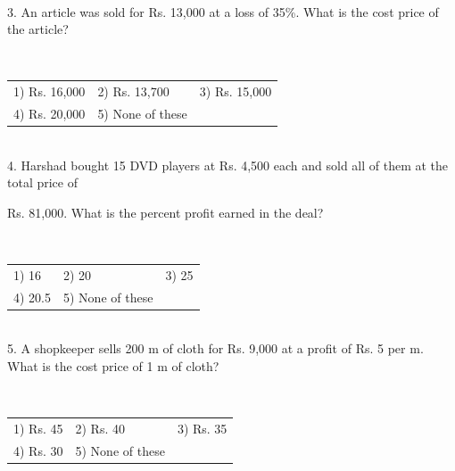 \documentclass{article}
\begin{document}
	\noindent 


	\noindent 
	
	\noindent 
	
	\noindent  \\ 3.   An article was sold for Rs. 13,000 at a loss of 35\%. What is the cost price of the article?
	
	\noindent 
	


	\noindent  \\ 
	\begin{tabular}{p{1.7in} p{1.6in} p{1.6in}} \\ 
 1) Rs. 16,000             & 2) Rs. 13,700       & 3) Rs. 15,000       \\
4) Rs. 20,000       & 5) None of these \\
\end{tabular} 
	
	\noindent 
	
	\noindent 
	
	\noindent 
	
	\noindent \\  4.   Harshad bought 15 DVD players at Rs. 4,500 each and sold all of them at the total price of
	
	\noindent 
	
	\noindent Rs. 81,000. What is the percent profit earned in the deal?
	
	\noindent 
	
	\noindent  \\ 
	\begin{tabular}{p{1.7in} p{1.6in} p{1.6in}} \\ 
 1) 16                        & 2) 20                 & 3) 25                 \\
4) 20.5              & 5) None of these \\
\end{tabular}
	
	\noindent 
	
	\noindent 
	
	\noindent 
	
	\noindent  \\ 5.   A shopkeeper sells 200 m of cloth for Rs. 9,000 at a profit of Rs. 5 per m. What is the cost price of 1 m of cloth?
	
	\noindent 
	
	\noindent  \\ 
	\begin{tabular}{p{1.7in} p{1.6in} p{1.6in}} \\ 
 1) Rs. 45                     & 2) Rs. 40              & 3) Rs. 35              \\
4) Rs. 30              & 5) None of these \\
\end{tabular}
	
\end{document}
